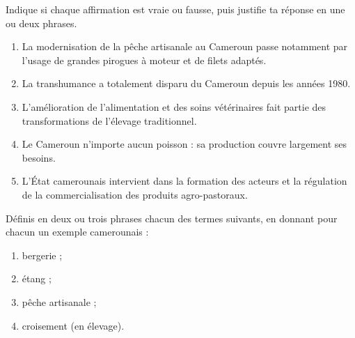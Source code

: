 \documentclass[11pt]{article}
\begin{document}
\begin{exercice}
Indique si chaque affirmation est vraie ou fausse, puis justifie ta réponse en une ou deux phrases.

\begin{enumerate}
\item La modernisation de la pêche artisanale au Cameroun passe notamment par l'usage de grandes pirogues à moteur et de filets adaptés.
\item La transhumance a totalement disparu du Cameroun depuis les années 1980.
\item L'amélioration de l'alimentation et des soins vétérinaires fait partie des transformations de l'élevage traditionnel.
\item Le Cameroun n'importe aucun poisson : sa production couvre largement ses besoins.
\item L'État camerounais intervient dans la formation des acteurs et la régulation de la commercialisation des produits agro-pastoraux.
\end{enumerate}
\end{exercice}

\begin{exercice}
Définis en deux ou trois phrases chacun des termes suivants, en donnant pour chacun un exemple camerounais :
\begin{enumerate}
\item bergerie ;
\item étang ;
\item pêche artisanale ;
\item croisement (en élevage).
\end{enumerate}
\end{exercice}
\end{document}

